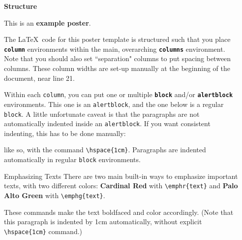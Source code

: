 \documentclass[final]{beamer}
\newlength{\sepwid}
\newlength{\firstcolwid}
\newcommand{\emphg}[1]{{\color{paloalto}\textbf{#1}}}
\newcommand{\emphr}[1]{{\color{cardinalred}\textbf{#1}}}
\begin{document}
\begin{frame}[t]




\begin{columns}[t]

\begin{column}{\sepwid}\end{column}

\begin{column}{\firstcolwid}

	\begin{alertblock}{\textbf{Structure}}
		
		This is an \emphr{example poster}.
		
		The \LaTeX \, code for this poster template is structured such that you place \emphg{\texttt{column}} environments within the main, overarching \emphg{\texttt{columns}} environment. Note that you should also set ``separation" columns to put spacing between columns. These column widths are set-up manually at the beginning of the document, near line 21.
		
		Within each \texttt{column}, you can put one or multiple \emphg{\texttt{block}} and/or \emphg{\texttt{alertblock}} environments. This one is an \texttt{alertblock}, and the one below is a regular \texttt{block}. A little unfortunate caveat is that the paragraphs are not automatically indented inside an \texttt{alertblock}. If you want consistent indenting, this has to be done manually:
		
		\hspace{1cm} like so, with the command \texttt{\textbackslash hspace\{1cm\}}. Paragraphs are indented automatically in regular \texttt{block} environments.
	\end{alertblock}
	
	\begin{block}{Emphasizing Texts}
		There are two main built-in ways to emphasize important texts, with two different colors: \emphr{Cardinal Red} with \texttt{\textbackslash emphr\{text\}} and \emphg{Palo Alto Green} with \texttt{\textbackslash emphg\{text\}}.
		
		These commands make the text boldfaced and color accordingly. (Note that this paragraph is indented by 1cm automatically, without explicit \texttt{\textbackslash hspace\{1cm\}} command.)
	\end{block}

\end{column}


\end{columns}
\end{frame}
\end{document}
